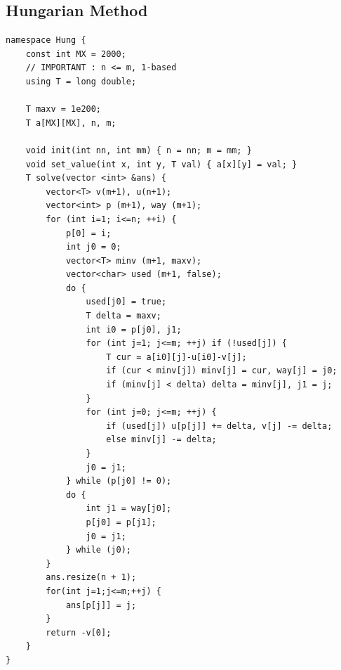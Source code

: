 \documentclass[landscape, 8pt, a4paper, oneside, twocolumn]{extarticle}
\begin{document}
\subsection{Hungarian Method}
\begin{verbatim}
namespace Hung {
    const int MX = 2000;
    // IMPORTANT : n <= m, 1-based
    using T = long double;

    T maxv = 1e200;
    T a[MX][MX], n, m;

    void init(int nn, int mm) { n = nn; m = mm; }
    void set_value(int x, int y, T val) { a[x][y] = val; }
    T solve(vector <int> &ans) {
        vector<T> v(m+1), u(n+1);
        vector<int> p (m+1), way (m+1);
        for (int i=1; i<=n; ++i) {
            p[0] = i;
            int j0 = 0;
            vector<T> minv (m+1, maxv);
            vector<char> used (m+1, false);
            do {
                used[j0] = true;
                T delta = maxv;
                int i0 = p[j0], j1;
                for (int j=1; j<=m; ++j) if (!used[j]) {
                    T cur = a[i0][j]-u[i0]-v[j];
                    if (cur < minv[j]) minv[j] = cur, way[j] = j0;
                    if (minv[j] < delta) delta = minv[j], j1 = j;
                }
                for (int j=0; j<=m; ++j) {
                    if (used[j]) u[p[j]] += delta, v[j] -= delta;
                    else minv[j] -= delta;
                }
                j0 = j1;
            } while (p[j0] != 0);
            do {
                int j1 = way[j0];
                p[j0] = p[j1];
                j0 = j1;
            } while (j0);
        }
        ans.resize(n + 1);
        for(int j=1;j<=m;++j) {
            ans[p[j]] = j;
        }
        return -v[0];
    }
}
\end{verbatim}
\end{document}

